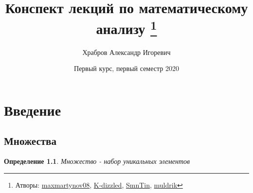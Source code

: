 \documentclass[12pt,letterpaper]{report}
\title{Конспект лекций по математическому анализу 
\thanks{Атворы: \href{https://github.com/maxmartynov08}{maxmartynov08}, \href{https://github.com/K-dizzled}{K-dizzled}, \href{https://github.com/SmnTin}{SmnTin}, \href{https://github.com/muldrik}{muldrik}}}
\author{Храбров Александр Игоревич}
\date{Первый курс, первый семестр 2020}
\newtheorem{conj}[theorem]{Определение}
\begin{document}
\fi
\maketitle
\tableofcontents
\newpage
\chapter{Введение}
\section{Множества}
\begin{conj} Множество - набор уникальных элементов \end{conj}
\end{document}
